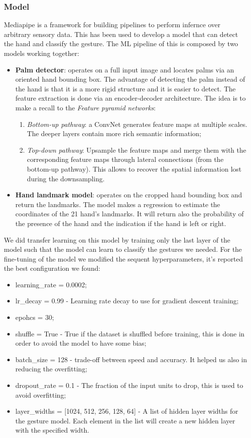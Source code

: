 \documentclass[10pt,twocolumn,letterpaper]{article}
\begin{document}
\subsubsection{Model}
Mediapipe is a framework for building pipelines to perform infernce over arbitrary sensory data. This has been used to develop a model that can detect the hand and classify the gesture.
The ML pipeline of this is composed by two models working together:
\begin{itemize}
   \item \textbf{Palm detector}: operates on a full input image and locates palms via an oriented hand bounding box. The advantage of detecting the palm instead of the hand 
   is that it is a more rigid structure and it is easier to detect. The feature extraction is done via an encoder-decoder architecture. The idea is to make a recall to the 
   \textit{Feature pyramid networks}:
   \begin{enumerate}
      \item \textit{Bottom-up pathway}: a ConvNet generates feature maps at multiple scales. The deeper layers contain more rich semantic information;
      \item \textit{Top-down pathway}: Upsample the feature maps and merge them with the corresponding feature maps through lateral connections (from the bottom-up pathway).
      This allows to recover the spatial information lost during the downsampling.
   \end{enumerate}
   \item \textbf{Hand landmark model}: operates on the cropped hand bounding box and return the landmarks. 
   The model makes a regression to estimate the coordinates of the 21 hand's landmarks. It will return also the probability of the presence of the hand and 
   the indication if the hand is left or right.
\end{itemize}
We did transfer learning on this model by training only the last layer of the model such that the model can learn to classify the gestures we needed.
For the fine-tuning of the model we modified the sequent hyperparameters, it's reported the best configuration we found:
\begin{itemize}
   \item learning\_rate = 0.0002;
   \item lr\_decay = 0.99 - Learning rate decay to use for gradient descent training;
   \item epohcs = 30;
   \item shuffle = True - True if the dataset is shuffled before training, this is done in order to avoid the model to have some bias;
   \item batch\_size = 128 - trade-off between speed and accuracy. It helped us also in reducing the overfitting;
   \item dropout\_rate = 0.1 - The fraction of the input units to drop, this is used to avoid overfitting;
   \item layer\_widths = [1024, 512, 256, 128, 64] - A list of hidden layer widths for the gesture model. Each element in the list will 
   create a new hidden layer with the specified width.
\end{itemize}
\end{document}
